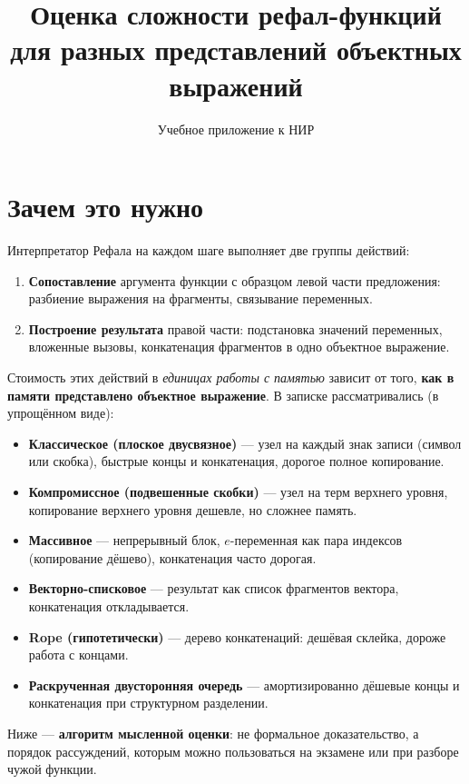 \documentclass[12pt,a4paper]{article}
\title{Оценка сложности рефал-функций\\для разных представлений объектных выражений}
\author{Учебное приложение к НИР}
\date{}
\begin{document}
\maketitle

\tableofcontents
\newpage

\section{Зачем это нужно}

Интерпретатор Рефала на каждом шаге выполняет две группы действий:
\begin{enumerate}
  \item \textbf{Сопоставление} аргумента функции с образцом левой части предложения: разбиение выражения на фрагменты, связывание переменных.
  \item \textbf{Построение результата} правой части: подстановка значений переменных, вложенные вызовы, конкатенация фрагментов в одно объектное выражение.
\end{enumerate}

Стоимость этих действий в \emph{единицах работы с памятью} зависит от того, \textbf{как в памяти представлено объектное выражение}. В записке рассматривались (в упрощённом виде):
\begin{itemize}
  \item \textbf{Классическое (плоское двусвязное)} --- узел на каждый знак записи (символ или скобка), быстрые концы и конкатенация, дорогое полное копирование.
  \item \textbf{Компромиссное (подвешенные скобки)} --- узел на терм верхнего уровня, копирование верхнего уровня дешевле, но сложнее память.
  \item \textbf{Массивное} --- непрерывный блок, \(e\)-переменная как пара индексов (копирование дёшево), конкатенация часто дорогая.
  \item \textbf{Векторно-списковое} --- результат как список фрагментов вектора, конкатенация откладывается.
  \item \textbf{Rope (гипотетически)} --- дерево конкатенаций: дешёвая склейка, дороже работа с концами.
  \item \textbf{Раскрученная двусторонняя очередь} --- амортизированно дёшевые концы и конкатенация при структурном разделении.
\end{itemize}

Ниже --- \textbf{алгоритм мысленной оценки}: не формальное доказательство, а порядок рассуждений, которым можно пользоваться на экзамене или при разборе чужой функции.
\end{document}
